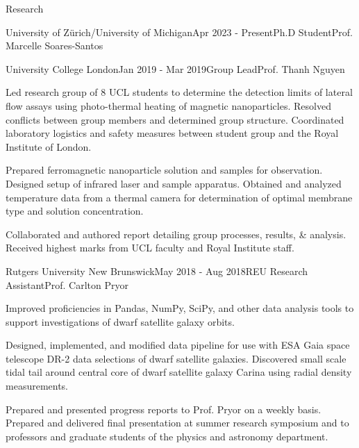 \documentclass{resume} %
\begin{document}
\begin{rSection}{Research}
\begin{rSubsection}{University of Zürich/University of Michigan}{Apr 2023 - Present}{Ph.D Student}{Prof. Marcelle Soares-Santos}
\newpage

\begin{rSubsection}{University College London}{Jan 2019 - Mar 2019}{Group Lead}{Prof. Thanh Nguyen}
\item Led research group of 8 UCL students to determine the detection limits of lateral flow assays using photo-thermal heating of magnetic nanoparticles. Resolved conflicts between group members and determined group structure. Coordinated laboratory logistics and safety measures between student group and the Royal Institute of London.
\item Prepared ferromagnetic nanoparticle solution and samples for observation. Designed setup of infrared laser and sample apparatus. Obtained and analyzed temperature data from a thermal camera for determination of optimal membrane type and solution concentration.
\item Collaborated and authored report detailing group processes, results, \& analysis. Received highest marks from UCL faculty and Royal Institute staff.
\end{rSubsection}

\begin{rSubsection}{Rutgers University New Brunswick}{May 2018 - Aug 2018}{REU Research Assistant}{Prof. Carlton Pryor}
\item Improved proficiencies in Pandas, NumPy, SciPy, and other data analysis tools to support investigations of dwarf satellite galaxy orbits.
\item Designed, implemented, and modified data pipeline for use with ESA Gaia space telescope DR-2 data selections of dwarf satellite galaxies. Discovered small scale tidal tail around central core of dwarf satellite galaxy Carina using radial density measurements.
\item Prepared and presented progress reports to Prof. Pryor on a weekly basis. Prepared and delivered final presentation at summer research symposium and to professors and graduate students of the physics and astronomy department.
\end{rSubsection}



\end{rSubsection}
\end{rSection}
\end{document}

